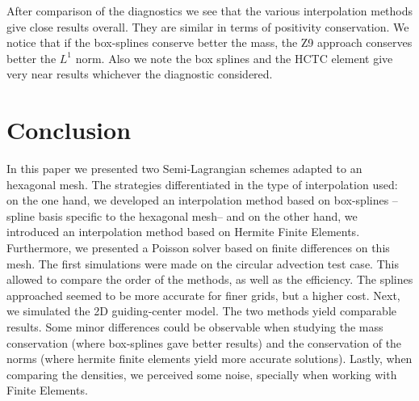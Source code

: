 \documentclass[proc]{edpsmath}
\begin{document}
After comparison of the diagnostics we see that the various interpolation methods give close results overall. They are similar in terms of positivity conservation. We notice that if the box-splines conserve better the mass, the Z9 approach conserves better the $L^1$ norm. Also we note the box splines and the HCTC element give very near results whichever the diagnostic considered.  


\section{Conclusion}
\label{sec:conclusion}
In this paper we presented two Semi-Lagrangian schemes adapted to an hexagonal mesh. The strategies differentiated in the type of interpolation used: on the one hand, we developed an interpolation method based on box-splines --spline basis specific to the hexagonal mesh-- and on the other hand, we introduced an interpolation method based on Hermite Finite Elements. Furthermore, we presented a Poisson solver based on finite differences on this mesh. The first simulations were made on the circular advection test case. This allowed to compare the order of the methods, as well as the efficiency. The splines approached seemed to be more accurate for finer grids, but a higher cost. Next, we simulated the 2D guiding-center model. The two methods yield comparable results. Some minor differences could be observable when studying the mass conservation (where box-splines gave better results) and the conservation of the norms (where hermite finite elements yield more accurate solutions). Lastly, when comparing the densities, we perceived some noise, specially when working with Finite Elements.




\end{document}
